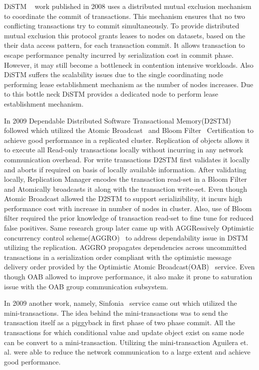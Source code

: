 \documentclass[12pt,english]{report}
\begin{document}
DiSTM ~\cite{Kotselidis08distm:a} work published in 2008 uses a distributed
mutual exclusion mechanism to coordinate the commit of transactions. This mechanism ensures that no two conflicting transactions try to commit simultaneously. To provide distributed mutual exclusion this protocol grants leases to nodes on datasets, based on the their data access pattern, for each transaction commit. It allows transaction to escape performance penalty incurred by serialization cost in commit phase. However, it may still become a bottleneck in contention intensive workloads. Also DiSTM suffers the scalability issues due to the single coordinating node performing lease establishment mechanism as the number of nodes increases. Due to this bottle neck DiSTM provides a dedicated node to perform lease establishment mechanism.

In 2009 Dependable Distributed Software Transactional Memory(D2STM)~\cite{D2STM:5368778} followed which utilized the Atomic Broadcast~\cite{Defago:2004:TOB:1041680.1041682} and Bloom Filter~\cite{Bloom:1970:STH:362686.362692} Certification to achieve good performance in a replicated cluster. Replication of objects allows it to execute all Read-only transactions locally without incurring in any network communication overhead. For write transactions D2STM first validates it locally and aborts if required on basis of locally available information. After validating locally, Replication Manager encodes the transaction read-set in a Bloom Filter and Atomically broadcasts it along with the transaction write-set. Even though Atomic Broadcast allowed the D2STM to support serializibility, it incurs high performance cost with increase in number of nodes in cluster. Also, use of Bloom filter required the prior knowledge of transaction read-set to fine tune for reduced false positives. Same research group later came up with AGGRessively Optimistic concurrency control scheme(AGGRO)~\cite{AGGRO:5598236} to address dependability issue in DSTM utilizing the replication. AGGRO propagates dependencies across uncommitted transactions in a serialization order compliant with the optimistic message delivery order provided by the Optimistic Atomic Broadcast(OAB)~\cite{OAB:Pedone200379} service. Even though OAB allowed to improve performance, it also make it prone to saturation issue with the OAB group communication subsystem.  

In 2009 another work, namely, Sinfonia~\cite{Aguilera:2009:SNP:1629087.1629088} service came out which utilized the mini-transactions. The idea behind the mini-transactions was to send the transaction itself as a piggyback in first phase of two phase commit. All the transactions for which conditional value and update object exist on same node can be convert to a mini-transaction. Utilizing the mini-transaction Aguilera et. al. were able to reduce the network communication to a large extent and achieve good performance.
\end{document}
